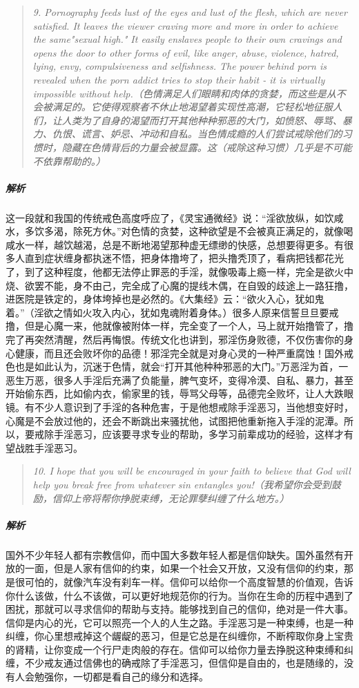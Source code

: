 \begin{quote}\it
    9. Pornography feeds lust of the eyes and lust of the flesh, which are never satisfied. It leaves the viewer craving more and more in order to achieve the same"sexual high." It easily enslaves people to their own cravings and opens the door to other forms of evil, like anger, abuse, violence, hatred, lying, envy, compulsiveness and selfishness. The power behind porn is revealed when the porn addict tries to stop their habit - it is virtually impossible without help.（色情满足人们眼睛和肉体的贪婪，而这些是从不会被满足的。它使得观察者不休止地渴望着实现性高潮，它轻松地征服人们，让人类为了自身的渴望而打开其他种种邪恶的大门，如愤怒、辱骂、暴力、仇恨、谎言、妒忌、冲动和自私。当色情成瘾的人们尝试戒除他们的习惯时，隐藏在色情背后的力量会被显露。这（戒除这种习惯）几乎是不可能不依靠帮助的。）
\end{quote}

\subparagraph{解析} 这一段就和我国的传统戒色高度呼应了，《灵宝通微经》说：“淫欲放纵，如饮咸水，多饮多渴，除死方休。”对色情的贪婪，这种欲望是不会被真正满足的，就像喝咸水一样，越饮越渴，总是不断地渴望那种虚无缥缈的快感，总想要得更多。有很多人直到症状缠身都执迷不悟，把身体撸垮了，把头撸秃顶了，看病把钱都花光了，到了这种程度，他都无法停止罪恶的手淫，就像吸毒上瘾一样，完全是欲火中烧、欲罢不能，身不由己，完全成了心魔的提线木偶，在自毁的歧途上一路狂撸，进医院是铁定的，身体垮掉也是必然的。《大集经》云：“欲火入心，犹如鬼着。”（淫欲之情如火攻入内心，犹如鬼魂附着身体。）很多人原来信誓旦旦要戒撸，但是心魔一来，他就像被附体一样，完全变了一个人，马上就开始撸管了，撸完了再突然清醒，然后再悔恨。传统文化也讲到，邪淫伤身败德，不仅伤害你的身心健康，而且还会败坏你的品德！邪淫完全就是对身心灵的一种严重腐蚀！国外戒色也是如此认为，沉迷于色情，就会“打开其他种种邪恶的大门。”万恶淫为首，一恶生万恶，很多人手淫后充满了负能量，脾气变坏，变得冷漠、自私、暴力，甚至开始偷东西，比如偷内衣，偷家里的钱，辱骂父母等，品德完全败坏，让人大跌眼镜。有不少人意识到了手淫的各种危害，于是他想戒除手淫恶习，当他想变好时，心魔是不会放过他的，还会不断跳出来骚扰他，试图把他重新拖入手淫的泥潭。所以，要戒除手淫恶习，应该要寻求专业的帮助，多学习前辈成功的经验，这样才有望战胜手淫恶习。

\begin{quote}\it
    10. I hope that you will be encouraged in your faith to believe that God will help you break free from whatever sin entangles you!（我希望你会受到鼓励，信仰上帝将帮你挣脱束缚，无论罪孽纠缠了什么地方。）
\end{quote}

\subparagraph{解析} 国外不少年轻人都有宗教信仰，而中国大多数年轻人都是信仰缺失。国外虽然有开放的一面，但是人家有信仰的约束，如果一个社会又开放，又没有信仰的约束，那是很可怕的，就像汽车没有刹车一样。信仰可以给你一个高度智慧的价值观，告诉你什么该做，什么不该做，可以更好地规范你的行为。当你在生命的历程中遇到了困扰，那就可以寻求信仰的帮助与支持。能够找到自己的信仰，绝对是一件大事。信仰是内心的光，它可以照亮一个人的人生之路。手淫恶习是一种束缚，也是一种纠缠，你心里想戒掉这个龌龊的恶习，但是它总是在纠缠你，不断榨取你身上宝贵的肾精，让你变成一个行尸走肉般的存在。信仰可以给你力量去挣脱这种束缚和纠缠，不少戒友通过信佛也的确戒除了手淫恶习，但信仰是自由的，也是随缘的，没有人会勉强你，一切都是看自己的缘分和选择。

